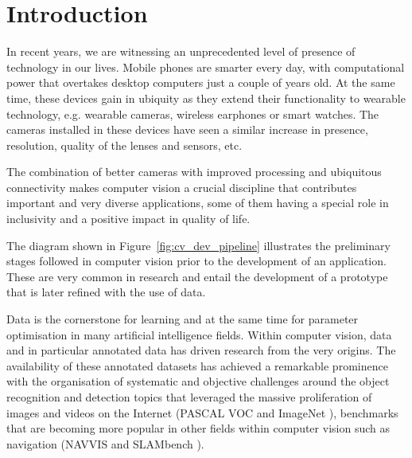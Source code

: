 \chapter{Introduction}\label{ch:introduction}

In recent years, we are witnessing an unprecedented level of presence of technology in our lives. Mobile phones are smarter every day, with computational power that overtakes desktop computers just a couple of years old. At the same time, these devices gain in ubiquity as they extend their functionality to wearable technology, e.g. wearable cameras, wireless earphones or smart watches. The cameras installed in these devices have seen a similar increase in presence, resolution, quality of the lenses and sensors, etc.

The combination of better cameras with improved processing and ubiquitous connectivity makes computer vision a crucial discipline that contributes important and very diverse applications, some of them having a special role in inclusivity and a positive impact in quality of life.

The diagram shown in Figure~\ref{fig:cv_dev_pipeline} illustrates the preliminary stages followed in computer vision prior to the development of an application. These are very common in research and entail the development of a prototype that is later refined with the use of data. 

Data is the cornerstone for learning and at the same time for parameter optimisation in many artificial intelligence fields. Within computer vision, data and in particular annotated data has driven research from the very origins. The availability of these annotated datasets has achieved a remarkable prominence with the organisation of systematic and objective challenges around the object recognition and detection topics that leveraged the massive proliferation of images and videos on the Internet (PASCAL VOC \cite{everingham2010pascal} and ImageNet \citep{Deng2009}), benchmarks that are becoming  more popular in other fields within computer vision such as navigation (NAVVIS \cite{Huitl2012} and SLAMbench \cite{nardi2014introducing}).

